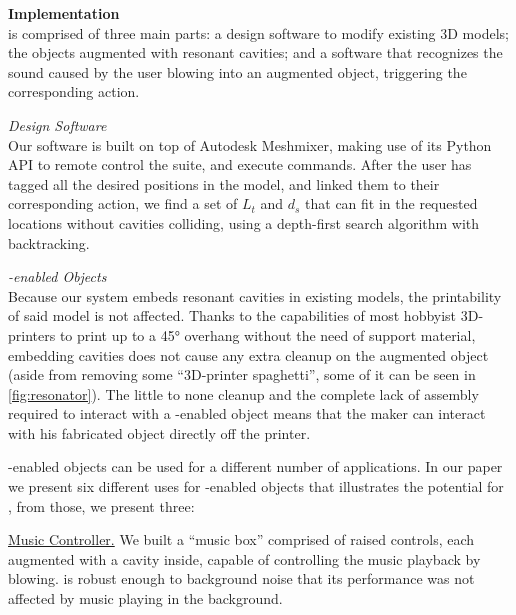         \textbf{Implementation}\\
          \bh is comprised of three main parts: a design software to modify
          existing 3D models; the objects augmented with resonant cavities; and
          a software that recognizes the sound caused by the user blowing into
          an augmented object, triggering the corresponding action.
          
          \textit{Design Software}\\
            Our software is built on top of Autodesk Meshmixer, making use of
            its Python API to remote control the suite, and execute commands.
            After the user has tagged all the desired positions in the model,
            and linked them to their corresponding action, we find a set of
            $L_t$ and $d_s$ that can fit in the requested locations without
            cavities colliding, using a depth-first search algorithm with
            backtracking.
            
          \textit{\bh-enabled Objects}\\
            Because our system embeds resonant cavities in existing models, the
            printability of said model is not affected. Thanks to the
            capabilities of most hobbyist 3D-printers to print up to a 45°
            overhang without the need of support material, embedding \bh
            cavities does not cause any extra cleanup on the augmented object
            (aside from removing some ``3D-printer spaghetti'', some of it can
            be seen in \cref{fig:resonator}). The little to none cleanup and
            the complete lack of assembly required to interact with a
            \bh-enabled object means that the maker can interact with his
            fabricated object directly off the printer.
            
            \bh-enabled objects can be used for a different number of
            applications. In our paper we present six different uses for
            \bh-enabled objects that illustrates the potential for \bh, from
            those, we present three:
            
              \underline{Music Controller.} We built a ``music box'' comprised
              of raised controls, each augmented with a \bh cavity inside,
              capable of controlling the music playback by blowing. \bh is
              robust enough to background noise that its performance was not
              affected by music playing in the background.
              

